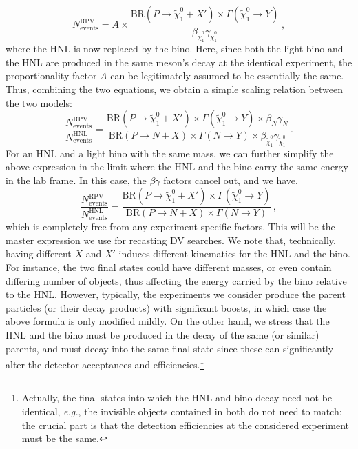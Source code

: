 \begin{itemize}
\begin{equation}
        N^{\text{RPV}}_{\text{events}} = A\times\frac{\text{BR}(P\to \tilde{\chi}^0_1+X') \times \Gamma(\tilde{\chi}_1^0\to Y)}{\beta_{\tilde{\chi}_1^0}\gamma_{\tilde{\chi}_1^0}}\,,
        \label{eq:RPV_events}
    \end{equation}
    where the HNL is now replaced by the bino. Here, since both the light bino and the HNL are produced in the same meson's decay at the identical experiment, the proportionality factor $A$ can 
    be legitimately assumed to be essentially the same. Thus, combining the two equations, we obtain a simple 
    scaling relation between the two models:
    \begin{equation}
        \frac{N^{\text{RPV}}_{\text{events}}}{N^{\text{HNL}}_{\text{events}}} = \frac{\text{BR}(P\to \tilde{\chi}^0_1+X') \times \Gamma(\tilde{\chi}^0_1\to Y) \times \beta_N\gamma_N}{\text{BR}(P\to N+X) \times \Gamma(N\to Y) \times \beta_{\tilde{\chi}^0_1}\gamma_{\tilde{\chi}^0_1}}\,.
        \label{eq:HNL_RPV_events}
    \end{equation}
    For an HNL and a light bino with the same mass, we can further simplify the above expression in the limit where the HNL and the bino carry the same energy in the lab frame.
    In this case, the $\beta \gamma$ factors cancel out, and we have,
    \begin{equation}
        \frac{N^{\text{RPV}}_{\text{events}}}{N^{\text{HNL}}_{\text{events}}} = \frac{\text{BR}(P\to \tilde{\chi}^0_1+X') \times \Gamma(\tilde{\chi}^0_1\to Y)}{\text{BR}(P\to N+X) \times \Gamma(N\to Y)}\,,
        \label{eq:HNL_RPV_events_simpler}
    \end{equation}
    which is completely free from any experiment-specific factors. This will be the master expression we use for recasting DV searches.
    We note that, technically, having different $X$ and $X'$ induces different kinematics for the HNL and the bino.
    For instance, the two final states could have different masses, or even contain differing number of objects, thus affecting the energy carried by the bino relative to the HNL.
    However, typically, the experiments we consider produce the parent particles (or their decay products) with significant boosts, in which case the above formula is only modified mildly.
    On the other hand, we stress that the HNL and the bino must be produced in the decay of the same (or similar) parents, and must decay into the same final state since these can significantly alter the detector acceptances and efficiencies.\footnote{Actually, the final states into which the HNL and bino decay need not be identical, \textit{e.g.}, the invisible objects contained in both do not need to match; the crucial part is that the detection efficiencies at the considered experiment must be the same. } 
    

\end{itemize}
